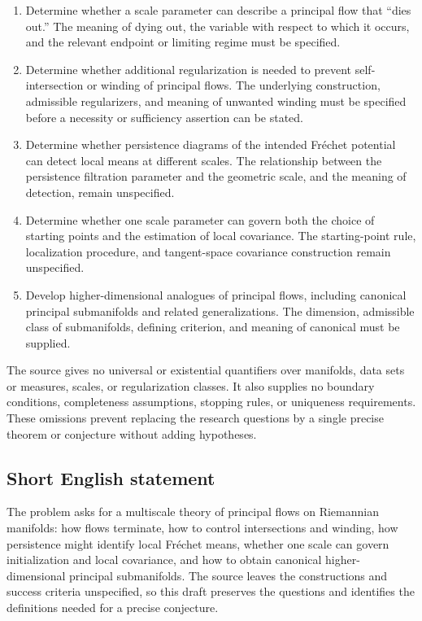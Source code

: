 \documentclass[11pt]{article}
\begin{document}
\begin{enumerate}
\item Determine whether a scale parameter can describe a principal flow that ``dies out.'' The meaning of dying out, the variable with respect to which it occurs, and the relevant endpoint or limiting regime must be specified.
\item Determine whether additional regularization is needed to prevent self-intersection or winding of principal flows. The underlying construction, admissible regularizers, and meaning of unwanted winding must be specified before a necessity or sufficiency assertion can be stated.
\item Determine whether persistence diagrams of the intended Fr\'echet potential can detect local means at different scales. The relationship between the persistence filtration parameter and the geometric scale, and the meaning of detection, remain unspecified.
\item Determine whether one scale parameter can govern both the choice of starting points and the estimation of local covariance. The starting-point rule, localization procedure, and tangent-space covariance construction remain unspecified.
\item Develop higher-dimensional analogues of principal flows, including canonical principal submanifolds and related generalizations. The dimension, admissible class of submanifolds, defining criterion, and meaning of canonical must be supplied.
\end{enumerate}

The source gives no universal or existential quantifiers over manifolds, data sets or measures, scales, or regularization classes. It also supplies no boundary conditions, completeness assumptions, stopping rules, or uniqueness requirements. These omissions prevent replacing the research questions by a single precise theorem or conjecture without adding hypotheses.
\subsection{Short English statement}
The problem asks for a multiscale theory of principal flows on Riemannian manifolds: how flows terminate, how to control intersections and winding, how persistence might identify local Fr\'echet means, whether one scale can govern initialization and local covariance, and how to obtain canonical higher-dimensional principal submanifolds. The source leaves the constructions and success criteria unspecified, so this draft preserves the questions and identifies the definitions needed for a precise conjecture.
\end{document}
